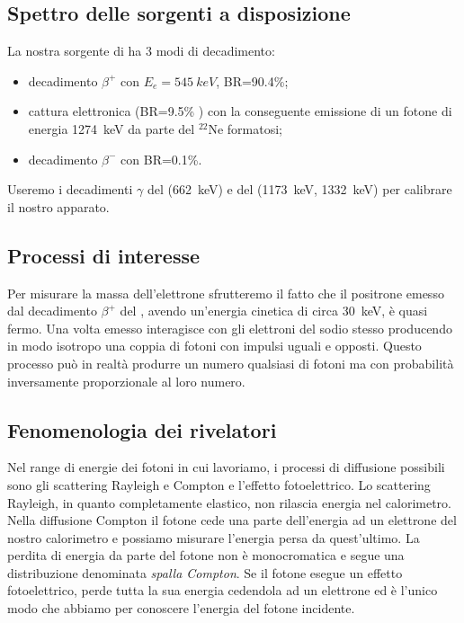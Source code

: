 \subsection{Spettro delle sorgenti a disposizione}

La nostra sorgente di \na{} ha 3 modi di decadimento:
\begin{itemize}
\item decadimento $\beta^+$ con $E_e=\SI{545}{keV}$, BR=90.4\%;
\item cattura elettronica (BR=9.5\% ) con la conseguente emissione di un fotone di energia \SI{1274}{keV} da parte del $^{22}$Ne formatosi;
\item decadimento $\beta^-$ con BR=0.1\%.
\end{itemize}

Useremo i decadimenti $\gamma$ del \cs{} (\SI{662}{keV}) e del \co{} (\SI{1173}{keV}, \SI{1332}{keV}) per calibrare il nostro apparato.

\subsection{Processi di interesse}

Per misurare la massa dell'elettrone sfrutteremo il fatto che il positrone emesso dal decadimento $\beta^+$ del \na{}, avendo un'energia cinetica di circa \SI{30}{keV}, è quasi fermo. Una volta emesso interagisce con gli elettroni del sodio stesso producendo in modo isotropo una coppia di fotoni con impulsi uguali e opposti. Questo processo può in realtà produrre un numero qualsiasi di fotoni ma con probabilità inversamente proporzionale al loro numero.


\subsection{Fenomenologia dei rivelatori}


Nel range di energie dei fotoni in cui lavoriamo, i processi di diffusione possibili sono gli scattering Rayleigh e Compton e l'effetto fotoelettrico.
Lo scattering Rayleigh, in quanto completamente elastico, non rilascia energia nel calorimetro.
Nella diffusione Compton il fotone cede una parte dell'energia ad un elettrone del nostro calorimetro e possiamo misurare l'energia persa da quest'ultimo. La perdita di energia da parte del fotone non è monocromatica e segue una distribuzione denominata \emph{spalla Compton}.
Se il fotone esegue un effetto fotoelettrico, perde tutta la sua energia cedendola ad un elettrone ed è l'unico modo che abbiamo per conoscere l'energia del fotone incidente.

